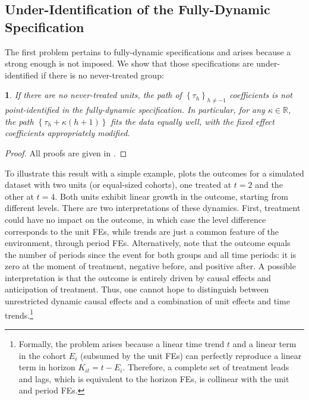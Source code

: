 \documentclass[english,11pt]{article}
\theoremstyle{plain}
\theoremstyle{plain}
\newtheorem{prop}{\protect\propositionname}
\theoremstyle{plain}
\theoremstyle{plain}
\let\ref\Cref
\providecommand{\propositionname}{Proposition}
\begin{document}
\subsection{Under-Identification of the Fully-Dynamic Specification\label{subsec:Underidentification}}

The first problem pertains to fully-dynamic specifications and arises
because a strong enough \ref{assu:A2} is not imposed. We show that
those specifications are under-identified if there is no never-treated
group:
\begin{prop}
\label{prop:Underid}If there are no never-treated units, the path
of $\left\{ \tau_{h}\right\} _{h\ne-1}$ coefficients is not point-identified
in the fully-dynamic specification. In particular, for any $\kappa\in\mathbb{R}$,
the path $\left\{ \tau_{h}+\kappa\left(h+1\right)\right\} $ fits
the data equally well, with the fixed effect coefficients appropriately
modified.
\end{prop}
\begin{proof}
All proofs are given in \ref{sec:appx-proofs}.
\end{proof}
To illustrate this result with a simple example, \ref{fig:UnderId}
plots the outcomes for a simulated dataset with two units (or equal-sized
cohorts), one treated at $t=2$ and the other at $t=4$. Both units
exhibit linear growth in the outcome, starting from different levels.
There are two interpretations of these dynamics. First, treatment
could have no impact on the outcome, in which case the level difference
corresponds to the unit FEs, while trends are just a common feature
of the environment, through period FEs. Alternatively, note that the
outcome equals the number of periods since the event for both groups
and all time periods: it is zero at the moment of treatment, negative
before, and positive after. A possible interpretation is that the
outcome is entirely driven by causal effects and anticipation of treatment.
Thus, one cannot hope to distinguish between unrestricted dynamic
causal effects and a combination of unit effects and time trends.\footnote{Formally, the problem arises because a linear time trend $t$ and
a linear term in the cohort $E_{i}$ (subsumed by the unit FEs) can
perfectly reproduce a linear term in horizon $K_{it}=t-E_{i}$. Therefore,
a complete set of treatment leads and lags, which is equivalent to
the horizon FEs, is collinear with the unit and period FEs.}
\end{document}
